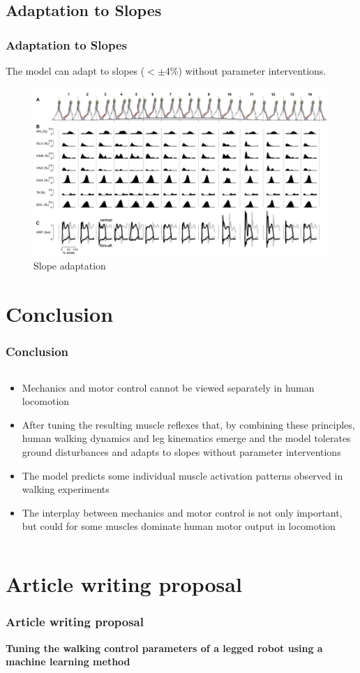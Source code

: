 \documentclass[10pt]{beamer}
\begin{document}
\subsection[Results]{Adaptation to Slopes}

\begin{frame}
	\frametitle{Adaptation to Slopes}
	
	The model can adapt to slopes ($ < \pm 4\% $) without parameter interventions.
	
	\begin{figure}
		\centering
		\includegraphics[height=.65\textheight]{images/slope_adaptation.pdf}
		\caption{Slope adaptation}	
	\end{figure}
	
\end{frame}

\section{Conclusion}	
\begin{frame}
	\frametitle{Conclusion}
	
	\begin{columns}
		\begin{column}{1.0\textwidth}
			\begin{itemize}
				\item Mechanics and motor control cannot be viewed separately in human locomotion
				\item After tuning the resulting muscle reflexes that, by combining these principles, human walking dynamics and leg kinematics emerge and the model tolerates ground disturbances and adapts to slopes without parameter interventions
				\item The model predicts some individual muscle activation patterns observed in walking experiments
				\item The interplay between mechanics and motor control is not only important, but could for some muscles dominate human motor output in locomotion
			\end{itemize}
		\end{column}
	\end{columns}
\end{frame}

\section{Article writing proposal}
	\begin{frame}
	\frametitle{Article writing proposal}
	\centering
	\LARGE
	\bf
	Tuning the walking control parameters of a legged robot using a machine learning method
\end{frame}
\end{document}
